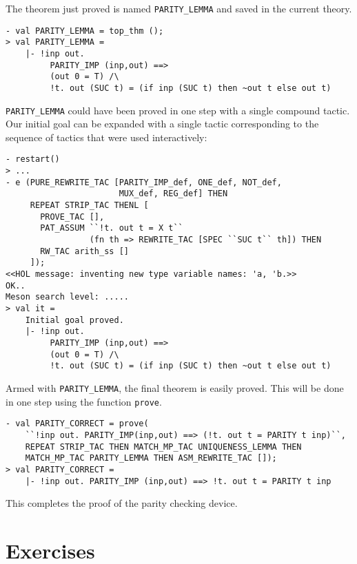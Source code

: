 \noindent The theorem just proved is named
{\small\verb|PARITY_LEMMA|} and saved in the current theory.

\begin{session}
\begin{verbatim}
- val PARITY_LEMMA = top_thm ();
> val PARITY_LEMMA =
    |- !inp out.
         PARITY_IMP (inp,out) ==>
         (out 0 = T) /\
         !t. out (SUC t) = (if inp (SUC t) then ~out t else out t)
\end{verbatim}
\end{session}

{\small\verb|PARITY_LEMMA|} could have been proved in one step with a
single compound tactic.  Our initial goal can be expanded with a
single tactic corresponding to the sequence of tactics that were used
interactively:

\begin{session}
\begin{verbatim}
- restart()
> ...
- e (PURE_REWRITE_TAC [PARITY_IMP_def, ONE_def, NOT_def,
                       MUX_def, REG_def] THEN
     REPEAT STRIP_TAC THENL [
       PROVE_TAC [],
       PAT_ASSUM ``!t. out t = X t``
                 (fn th => REWRITE_TAC [SPEC ``SUC t`` th]) THEN
       RW_TAC arith_ss []
     ]);
<<HOL message: inventing new type variable names: 'a, 'b.>>
OK..
Meson search level: .....
> val it =
    Initial goal proved.
    |- !inp out.
         PARITY_IMP (inp,out) ==>
         (out 0 = T) /\
         !t. out (SUC t) = (if inp (SUC t) then ~out t else out t)
\end{verbatim}
\end{session}

Armed with {\small\verb|PARITY_LEMMA|}, the final theorem is easily
proved.  This will be done in one step using the \ML{} function
{\small\verb|prove|}.

\begin{session}
\begin{verbatim}
- val PARITY_CORRECT = prove(
    ``!inp out. PARITY_IMP(inp,out) ==> (!t. out t = PARITY t inp)``,
    REPEAT STRIP_TAC THEN MATCH_MP_TAC UNIQUENESS_LEMMA THEN
    MATCH_MP_TAC PARITY_LEMMA THEN ASM_REWRITE_TAC []);
> val PARITY_CORRECT =
    |- !inp out. PARITY_IMP (inp,out) ==> !t. out t = PARITY t inp
\end{verbatim}
\end{session}

\noindent This completes the proof of the
parity checking device.

\section{Exercises}
\label{exercises}

